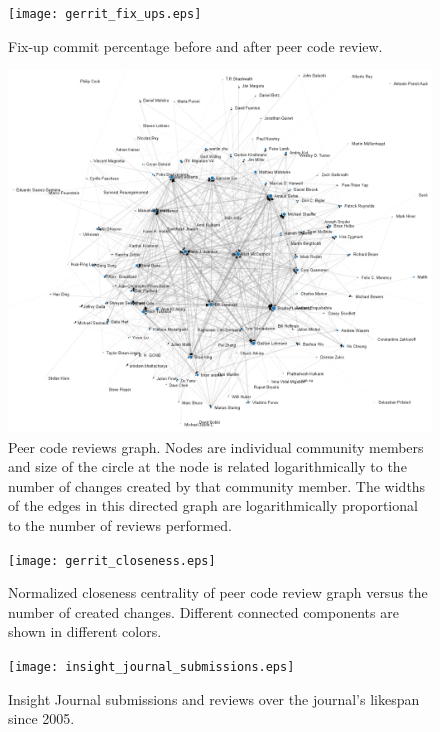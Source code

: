 \documentclass{frontiersENG} %
\begin{document}
\begin{figure}
  \centering
    \texttt{[image: gerrit\_fix\_ups.eps]}
    \caption{Fix-up commit percentage before and after peer code review.}
    \label{fig:gerrit_fix_ups}
\end{figure}

\begin{figure}
  \centering
    \showthe\textwidth
    \includegraphics[width=1.0\textwidth]{GerritGraphRender.png}
    \caption{Peer code reviews graph.  Nodes are individual community members and
      size of the circle at the node is related logarithmically to the number of changes
      created by that community member.  The widths of the edges in this directed
      graph are logarithmically proportional to the number of reviews performed.}
    \label{fig:GerritGraph}
\end{figure}

\begin{figure}
  \centering
    \texttt{[image: gerrit\_closeness.eps]}
    \caption{Normalized closeness centrality of peer code review graph versus
      the number of created changes.  Different connected components are shown
      in different colors.}
    \label{fig:GerritCloseness}
\end{figure}

\begin{figure}
  \centering
    \texttt{[image: insight\_journal\_submissions.eps]}
    \caption{Insight Journal submissions and reviews over the journal's
      likespan since 2005.}
    \label{fig:ij_submissions}
\end{figure}







\end{document}
